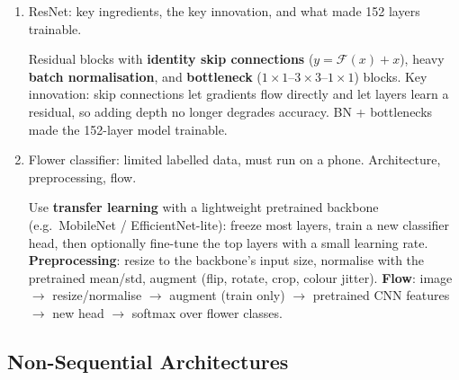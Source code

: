 \documentclass[10pt,a4paper]{article}
\newcommand{\q}[1]{\item #1}
\begin{document}
\begin{enumerate}[leftmargin=*,label=\textbf{Q\arabic*.}]

\q ResNet: key ingredients, the key innovation, and what made 152 layers trainable.
\begin{answerbox}
Residual blocks with \textbf{identity skip connections} ($y=\mathcal{F}(x)+x$), heavy \textbf{batch normalisation}, and \textbf{bottleneck} ($1\times1$--$3\times3$--$1\times1$) blocks. Key innovation: skip connections let gradients flow directly and let layers learn a residual, so adding depth no longer degrades accuracy. BN + bottlenecks made the 152-layer model trainable.
\end{answerbox}

\q Flower classifier: limited labelled data, must run on a phone. Architecture, preprocessing, flow.
\begin{answerbox}
Use \textbf{transfer learning} with a lightweight pretrained backbone (e.g.\ MobileNet / EfficientNet-lite): freeze most layers, train a new classifier head, then optionally fine-tune the top layers with a small learning rate. \textbf{Preprocessing}: resize to the backbone's input size, normalise with the pretrained mean/std, augment (flip, rotate, crop, colour jitter). \textbf{Flow}: image $\to$ resize/normalise $\to$ augment (train only) $\to$ pretrained CNN features $\to$ new head $\to$ softmax over flower classes.
\end{answerbox}

\end{enumerate}

\subsection{Non-Sequential Architectures}
\end{document}
